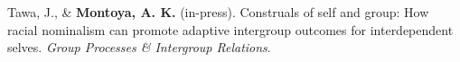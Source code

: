 \documentclass{article} %
\newcommand*{\img}[1]{%
	\raisebox{-.3\baselineskip}{%
		\texttt{[image: \#1]}%
	}%
}
\begin{document}
	
	Tawa, J., \& { \bf Montoya, A. K.} (in-press). Construals of self and group: How racial nominalism can promote adaptive intergroup outcomes for interdependent selves. \emph{Group Processes \& Intergroup Relations}. \href{https://osf.io/uzkbc/}{\img{OpenData.png}}
	
\end{document}
